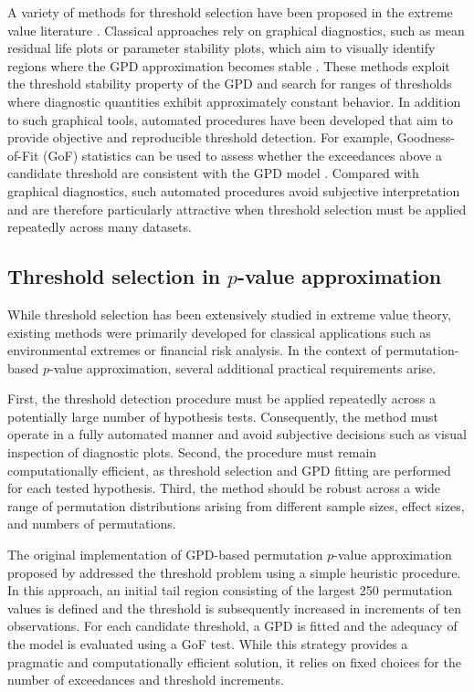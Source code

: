 A variety of methods for threshold selection have been proposed in the extreme value literature \citep{scarrott2012review,langousis2016threshold}. Classical approaches rely on graphical diagnostics, such as mean residual life plots \citep{davison1990models} or parameter stability plots, which aim to visually identify regions where the GPD approximation becomes stable \citep{scarrott2012review}. These methods exploit the threshold stability property of the GPD and search for ranges of thresholds where diagnostic quantities exhibit approximately constant behavior. In addition to such graphical tools, automated procedures have been developed that aim to provide objective and reproducible threshold detection. For example, Goodness-of-Fit (GoF) statistics can be used to assess whether the exceedances above a candidate threshold are consistent with the GPD model \citep{scarrott2012review,langousis2016threshold}. Compared with graphical diagnostics, such automated procedures avoid subjective interpretation and are therefore particularly attractive when threshold selection must be applied repeatedly across many datasets.

\subsection{Threshold selection in \texorpdfstring{$p$}{p}-value approximation}
\label{sec:6perm:threshold:role}

While threshold selection has been extensively studied in extreme value theory, existing methods were primarily developed for classical applications such as environmental extremes or financial risk analysis. In the context of permutation-based $p$-value approximation, several additional practical requirements arise.

First, the threshold detection procedure must be applied repeatedly across a potentially large number of hypothesis tests. Consequently, the method must operate in a fully automated manner and avoid subjective decisions such as visual inspection of diagnostic plots. Second, the procedure must remain computationally efficient, as threshold selection and GPD fitting are performed for each tested hypothesis. Third, the method should be robust across a wide range of permutation distributions arising from different sample sizes, effect sizes, and numbers of permutations.

The original implementation of GPD-based permutation $p$-value approximation proposed by \citet{knijnenburg2009fewer} addressed the threshold problem using a simple heuristic procedure. In this approach, an initial tail region consisting of the largest 250 permutation values is defined and the threshold is subsequently increased in increments of ten observations. For each candidate threshold, a GPD is fitted and the adequacy of the model is evaluated using a GoF test. While this strategy provides a pragmatic and computationally efficient solution, it relies on fixed choices for the number of exceedances and threshold increments.

